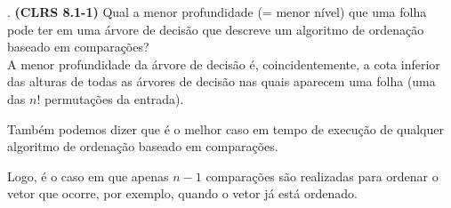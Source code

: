 
. \textbf{(CLRS 8.1-1)} Qual a menor profundidade (= menor nível) que uma folha pode ter em uma árvore de decisão que descreve um algoritmo de ordenação baseado em comparações?\\[6pt]
A menor profundidade da árvore de decisão é, coincidentemente, a cota inferior das alturas de todas as árvores de decisão nas quais aparecem uma folha (uma das $n!$ permutações da entrada).

Também podemos dizer que é o melhor caso em tempo de execução de qualquer algoritmo de ordenação baseado em comparações.

Logo, é o caso em que apenas $n - 1$ comparações são realizadas para ordenar o vetor que ocorre, por exemplo, quando o vetor já está ordenado.\\[12pt]